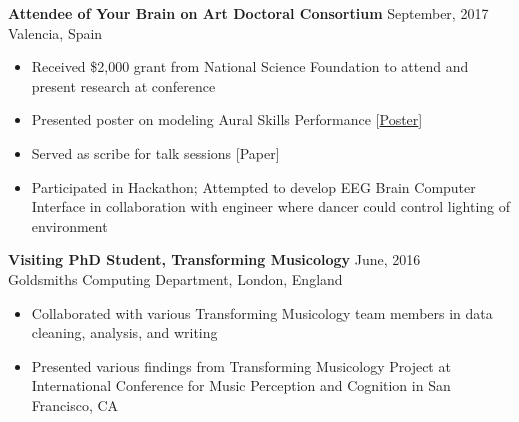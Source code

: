 \textbf{Attendee of Your Brain on Art Doctoral Consortium} \hfill September, 2017 \\
Valencia, Spain \hfill 
\begin{itemize} \itemsep -2pt %
\item Received \$2,000 grant from National Science Foundation to attend and present research at conference  
\item Presented poster on modeling Aural Skills Performance [\href{https://musiccog.lsu.edu/lab_posters/modeling-performance-aural.pdf}{Poster}] 
\item Served as scribe for talk sessions [Paper]
\item Participated in Hackathon; Attempted to develop EEG Brain Computer Interface in collaboration with engineer where dancer could control lighting of environment
\end{itemize}


\textbf{Visiting PhD Student, Transforming Musicology} \hfill June, 2016\\
Goldsmiths Computing Department, London, England \hfill 
\begin{itemize} \itemsep -2pt %
\item Collaborated with various Transforming Musicology team members in data cleaning, analysis, and writing
\item Presented various findings from Transforming Musicology Project at International Conference for Music Perception and Cognition in San Francisco, CA
\end{itemize}

